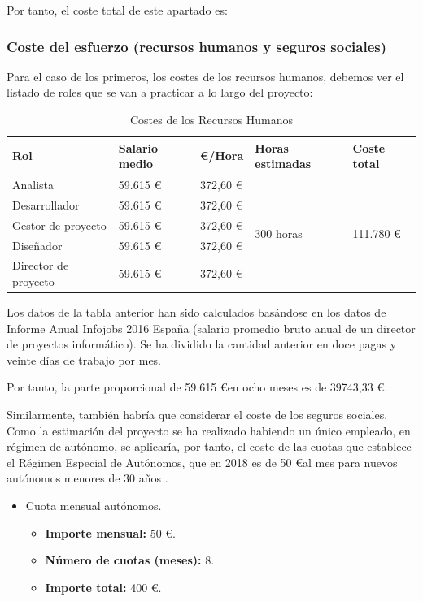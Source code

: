 \documentclass[twoside]{report}
\begin{document}
Por tanto, el coste total de este apartado es: 

\subsubsection{Coste del esfuerzo (recursos humanos y seguros sociales)}

Para el caso de los primeros, los costes de los recursos humanos, debemos ver el listado de roles que se van a practicar a lo largo del proyecto:

\begin{table}[H]
\center
\begin{tabular}{|l|l|l|l|l|}
\hline
Rol                & Salario medio & \euro/Hora   & Horas estimadas & Coste total \\ \hline
Analista           & 59.615 \euro      & 372,60 \euro & \multirow{5}{*}{300 horas} & \multirow{5}{*}{111.780 \euro} \\\cline{1-3}
Desarrollador      & 59.615 \euro      & 372,60 \euro  \\\cline{1-3}
Gestor de proyecto & 59.615 \euro      & 372,60 \euro \\ \cline{1-3}
Diseñador          & 59.615 \euro      & 372,60 \euro \\ \cline{1-3}
Director de proyecto & 59.615 \euro    & 372,60 \euro \\ \cline{1-3}
\hline
\end{tabular}
\caption{Costes de los Recursos Humanos}
\end{table}

Los datos de la tabla anterior han sido calculados basándose en los datos de \cite{infojobs2016} Informe Anual Infojobs 2016 España (salario promedio bruto anual de un director de proyectos informático). Se ha dividido la cantidad anterior en doce pagas y veinte días de trabajo por mes.

Por tanto, la parte proporcional de 59.615 \euro en ocho meses es de 39743,33 \euro.

Similarmente, también habría que considerar el coste de los seguros sociales. Como la estimación del proyecto se ha realizado  habiendo un único empleado, en régimen de autónomo, se aplicaría, por tanto, el coste de las cuotas que establece el Régimen Especial de Autónomos, que en 2018 es de 50 \euro al mes para nuevos autónomos menores de 30 años \cite{segsocialautonomos}.

\begin{itemize}
\item Cuota mensual autónomos.
	\begin{itemize}
	\item \textbf{Importe mensual:} 50 \euro.
	\item \textbf{Número de cuotas (meses): } 8.
	\item \textbf{Importe total: } 400 \euro.
	\end{itemize}
\end{itemize}
\end{document}
